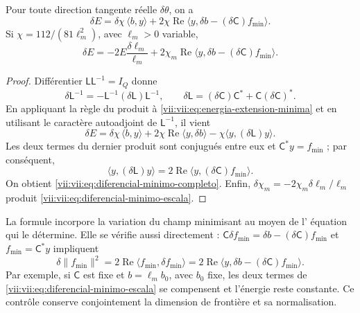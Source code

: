 \begin{theorem}
\label{vii:vii:thm:diferencial-minimo}
Pour toute direction tangente réelle \(\delta\theta\), on a
\begin{equation}
 \delta E
 =\delta\chi\,\langle b,y\rangle
   +2\chi\operatorname{Re}
       \langle y,\delta b-(\delta\mathsf C)f_{\min}\rangle.
 \label{vii:vii:eq:diferencial-minimo-completo}
\end{equation}
Si \(\chi=112/(81\ell_m^2)\), avec \(\ell_m>0\) variable,
\begin{equation}
 \delta E=-2E\frac{\delta\ell_m}{\ell_m}
 +2\chi_m\operatorname{Re}
       \langle y,\delta b-(\delta\mathsf C)f_{\min}\rangle.
 \label{vii:vii:eq:diferencial-minimo-escala}
\end{equation}
\end{theorem}

\begin{proof}
Différentier \(\mathsf L\mathsf L^{-1}=I_Q\) donne
\[
 \delta\mathsf L^{-1}
 =-\mathsf L^{-1}(\delta\mathsf L)\mathsf L^{-1},\qquad
 \delta\mathsf L=(\delta\mathsf C)\mathsf C^*
                      +\mathsf C(\delta\mathsf C)^*.
\]
En appliquant la règle du produit à \eqref{vii:vii:eq:energia-extension-minima} et en utilisant le caractère autoadjoint de \(\mathsf L^{-1}\), il vient
\[
 \delta E=\delta\chi\,\langle b,y\rangle
 +2\chi\operatorname{Re}\langle y,\delta b\rangle
 -\chi\langle y,(\delta\mathsf L)y\rangle.
\]
Les deux termes du dernier produit sont conjugués entre eux et
\(\mathsf C^*y=f_{\min}\) ; par conséquent,
\[
 \langle y,(\delta\mathsf L)y\rangle
 =2\operatorname{Re}\langle y,(\delta\mathsf C)f_{\min}\rangle.
\]
On obtient \eqref{vii:vii:eq:diferencial-minimo-completo}. Enfin, \(\delta\chi_m=-2\chi_m\delta\ell_m/\ell_m\) produit \eqref{vii:vii:eq:diferencial-minimo-escala}.
\end{proof}

La formule incorpore la variation du champ minimisant au moyen de l'
équation qui le détermine. Elle se vérifie aussi directement :
\(\mathsf C\delta f_{\min}=\delta b-(\delta\mathsf C)f_{\min}\)
et \(f_{\min}=\mathsf C^*y\) impliquent
\[
 \delta\|f_{\min}\|^2
 =2\operatorname{Re}\langle f_{\min},\delta f_{\min}\rangle
 =2\operatorname{Re}
     \langle y,\delta b-(\delta\mathsf C)f_{\min}\rangle.
\]
Par exemple, si \(\mathsf C\) est fixe et \(b=\ell_m b_0\), avec
\(b_0\) fixe, les deux termes de
\eqref{vii:vii:eq:diferencial-minimo-escala} se compensent et l'énergie
reste constante. Ce contrôle conserve conjointement la dimension
de frontière et sa normalisation.

